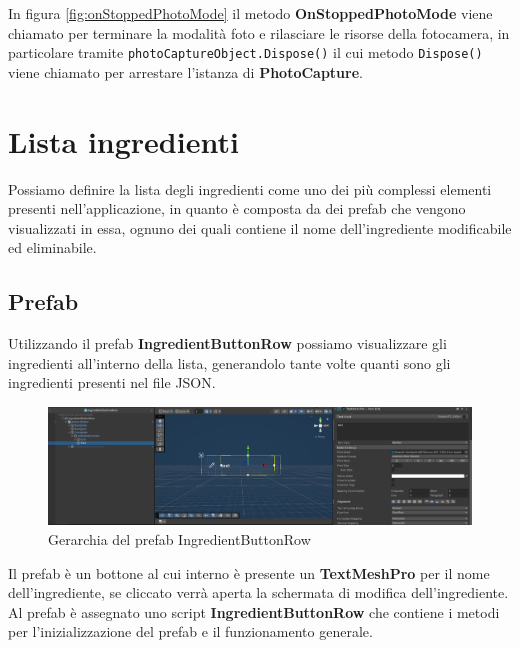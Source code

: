 In figura \ref{fig:onStoppedPhotoMode} il metodo \textbf{OnStoppedPhotoMode} viene chiamato per terminare la modalità foto e rilasciare le risorse della fotocamera, in particolare tramite \texttt{photoCaptureObject.Dispose()} il cui metodo \texttt{Dispose()} viene chiamato per arrestare l'istanza di \textbf{PhotoCapture}.

\section{Lista ingredienti}
Possiamo definire la lista degli ingredienti come uno dei più complessi elementi presenti nell'applicazione, in quanto è composta da dei prefab che vengono visualizzati in essa, ognuno dei quali contiene il nome dell'ingrediente modificabile ed eliminabile.
\subsection{Prefab}
Utilizzando il prefab \textbf{IngredientButtonRow} possiamo visualizzare gli ingredienti all'interno della lista, generandolo tante volte quanti sono gli ingredienti presenti nel file JSON.
\begin{figure}[H]
    \centering
    \includegraphics[width=1\textwidth,height=\textheight,keepaspectratio]{figures/chapter_1/prefab.png}
    \caption{Gerarchia del prefab IngredientButtonRow}
    \label{fig:prefab3D}
\end{figure}
Il prefab è un bottone al cui interno è presente un \textbf{TextMeshPro} per il nome dell'ingrediente, se cliccato verrà aperta la schermata di modifica dell'ingrediente. 
Al prefab è assegnato uno script \textbf{IngredientButtonRow} che contiene i metodi per l'inizializzazione del prefab e il funzionamento generale.
